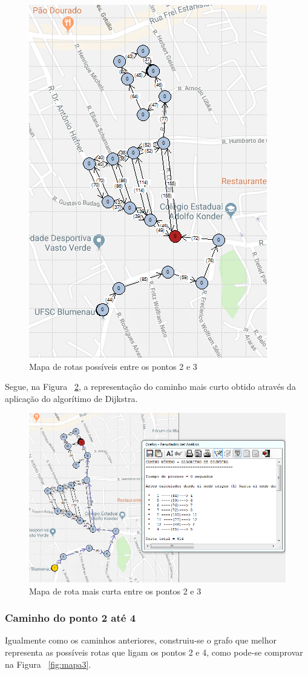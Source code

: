 \documentclass[a4paper,12pt]{article}
\begin{document}
\begin{figure}[H]
	\begin{center}
		\includegraphics[width=0.45\linewidth]{cam2.png}
	\end{center}
	\caption{Mapa de rotas possíveis entre os pontos 2 e 3}
	\label{fig:mapa2}
\end{figure}

Segue, na Figura ~\ref{fig:mapa2sol}, a representação do caminho mais curto obtido através da aplicação do algorítimo de Dijkstra.

\begin{figure}[H]
	\begin{center}
		\includegraphics[width=0.8\linewidth]{cam2sol.png}
	\end{center}
	\caption{Mapa de rota mais curta entre os pontos 2 e 3}
	\label{fig:mapa2sol}
\end{figure}

\subsubsection*{Caminho do ponto 2 até 4}
Igualmente como os caminhos anteriores, construiu-se o grafo que melhor representa as possíveis rotas que ligam os pontos 2 e 4, como pode-se comprovar na Figura ~\ref{fig:mapa3}.
\end{document}
